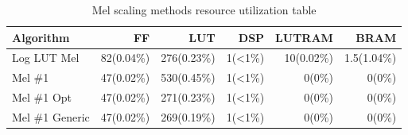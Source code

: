 \begin{table}[H]
    \centering
\begin{tabular}{ !{\color{ytblborder}\vrule}l!{\color{ytblborder}\vrule}rrrrr| } 
    \hline

    \hline
     \color{white}\bf{Algorithm} 
    & \color{white}\bf{FF} 
    & \color{white}\bf{LUT} 
    & \color{white}\bf{DSP} 
    & \color{white}\bf{LUTRAM} 
    & \color{white}\bf{BRAM} \\
    \hline

    \hline
     Log LUT Mel   & 82(0.04\%) & 276(0.23\%) & 1(<1\%) & 10(0.02\%) & 1.5(1.04\%)  \\
    \hline
    
    \hline
     Mel \#1     & 47(0.02\%) & 530(0.45\%) & 1(<1\%) & 0(0\%)  & 0(0\%)    \\
    \hline
    
    \hline
     Mel \#1 Opt      & 47(0.02\%) & 271(0.23\%) & 1(<1\%) & 0(0\%)  & 0(0\%)    \\
    \hline

    \hline
     Mel \#1 Generic     & 47(0.02\%) & 269(0.19\%) & 1(<1\%) & 0(0\%)  & 0(0\%)    \\
    \hline

    \hline
\end{tabular}
\caption{Mel scaling methods resource utilization table}
\label{tbl:mel_resource_util}
\end{table}



